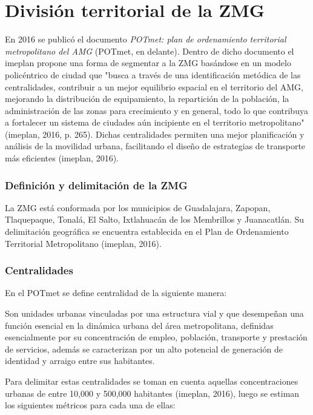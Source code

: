 \documentclass[openany]{book}
\begin{document}
	\section{División territorial de la ZMG}
		En 2016 se publicó el documento \textit{POTmet: plan de ordenamiento territorial metropolitano del AMG} (POTmet, en delante). Dentro de dicho documento el imeplan propone una forma de segmentar a la ZMG basándose en un modelo policéntrico de ciudad que "busca a través de una identificación metódica de las centralidades, contribuir a un mejor equilibrio espacial en el territorio del AMG, mejorando la distribución de equipamiento, la repartición de la población, la administración de las zonas para crecimiento y en general, todo lo que contribuya a fortalecer un sistema de ciudades aún incipiente en el territorio metropolitano" (imeplan, 2016, p. 265). Dichas centralidades permiten una mejor planificación y análisis de la movilidad urbana, facilitando el diseño de estrategias de transporte más eficientes (imeplan, 2016).

			\subsubsection{Definición y delimitación de la ZMG}
				La ZMG está conformada por los municipios de Guadalajara, Zapopan, Tlaquepaque, Tonalá, El Salto, Ixtlahuacán de los Membrillos y Juanacatlán.
				Su delimitación geográfica se encuentra establecida en el Plan de Ordenamiento Territorial Metropolitano (imeplan, 2016).

			\subsubsection{Centralidades}
				En el POTmet se define centralidad de la siguiente manera:
				\begin{center}
					Son unidades urbanas vinculadas por una estructura vial y que desempeñan una función esencial en la dinámica urbana del área metropolitana, definidas esencialmente por su concentración de empleo, población, transporte y prestación de servicios, además se caracterizan por un alto potencial de generación de identidad y arraigo entre sus habitantes.
				\end{center}
				Para delimitar estas centralidades se toman en cuenta aquellas concentraciones urbanas de entre 10,000 y 500,000 habitantes (imeplan, 2016), luego se estiman los siguientes métricos para cada una de ellas:
\end{document}

